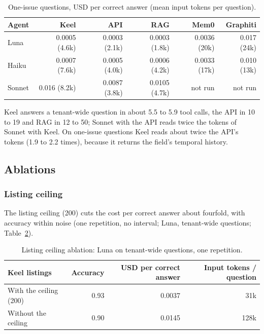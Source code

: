 \documentclass{article}
\begin{document}
\begin{table}[htbp]
\caption{One-issue questions, USD per correct answer (mean input tokens per question).}
\label{tab:oneissue-cost}
\centering
\small
\begin{tabular}{l r r r r r}
\toprule
Agent & Keel & API & RAG & Mem0 & Graphiti \\
\midrule
Luna & 0.0005 (4.6k) & 0.0003 (2.1k) & 0.0003 (1.8k) & 0.0036 (20k) & 0.017 (24k) \\
Haiku & 0.0007 (7.6k) & 0.0005 (4.0k) & 0.0006 (4.2k) & 0.0033 (17k) & 0.010 (13k) \\
Sonnet & 0.016 (8.2k) & 0.0087 (3.8k) & 0.0105 (4.7k) & not run & not run \\
\bottomrule
\end{tabular}
\end{table}

Keel answers a tenant-wide question in about 5.5 to 5.9 tool calls, the API in 10 to 19 and RAG in 12 to 50; Sonnet with the API reads twice the tokens of Sonnet with Keel. On one-issue questions Keel reads about twice the API's tokens (1.9 to 2.2 times), because it returns the field's temporal history.

\subsection{Ablations}
\label{sec:ablations}

\subsubsection*{Listing ceiling}

The listing ceiling (200) cuts the cost per correct answer about fourfold, with accuracy within noise (one repetition, no interval; Luna, tenant-wide questions; Table~\ref{tab:ceiling}).

\begin{table}[htbp]
\caption{Listing ceiling ablation: Luna on tenant-wide questions, one repetition.}
\label{tab:ceiling}
\centering
\small
\begin{tabular}{l r r r}
\toprule
Keel listings & Accuracy & USD per correct answer & Input tokens / question \\
\midrule
With the ceiling (200) & 0.93 & 0.0037 & 31k \\
Without the ceiling & 0.90 & 0.0145 & 128k \\
\bottomrule
\end{tabular}
\end{table}
\end{document}
